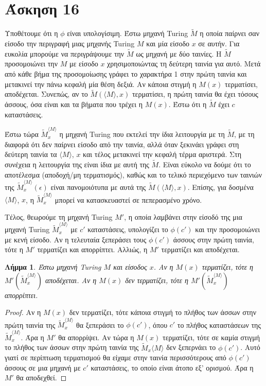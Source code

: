 \documentclass[a4paper, oneside, 11pt]{article}
\newtheorem{lm}[thm]{Λήμμα}
\theoremstyle{definition}
\begin{document}
\section*{Άσκηση 16}

Υποθέτουμε ότι η $\phi$ είναι υπολογίσιμη.
Έστω μηχανή Turing $\widetilde{M}$ η οποία παίρνει σαν είσοδο την περιγραφή μιας μηχανής Turing $M$ και μία
είσοδο $x$ σε αυτήν. 
Για ευκολία μπορούμε να περιγράψουμε την $\widetilde{M}$ ως μηχανή με δύο ταινίες. 
Η $\widetilde{M}$ προσομοιώνει την $M$ με είσοδο $x$ χρησιμοποιώντας τη δεύτερη ταινία για αυτό. 
Μετά από κάθε βήμα της προσομοίωσης γράφει το χαρακτήρα 1 στην πρώτη ταινία και μετακινεί την πάνω κεφαλή 
μία θέση δεξιά. Αν κάποια στιγμή η $M(x)$ τερματίσει, αποδέχεται. Συνεπώς, αν το $\widetilde{M}(\langle M\rangle,x)$ 
τερματίσει, 
η πρώτη ταινία θα έχει τόσους άσσους, όσα είναι και τα βήματα που τρέχει η $M(x)$. Έστω ότι η $\widetilde{M}$
έχει $c$ καταστάσεις.

Έστω τώρα $\widetilde{M}_{x}^{\langle M\rangle}$ η μηχανή Turing που εκτελεί την ίδια λειτουργία
με τη $\widetilde{M}$, με τη διαφορά ότι δεν παίρνει είσοδο από την ταινία, αλλά όταν ξεκινάει γράφει στη δεύτερη
ταινία τα $\langle M\rangle$, $x$ και τέλος μετακινεί την κεφαλή τέρμα αριστερά. Στη συνέχεια
η λειτουργία της είναι ίδια με αυτή της $\widetilde{M}$.
Είναι εύκολο να δούμε ότι το αποτέλεσμα (αποδοχή/μη τερματισμός), καθώς και το τελικό 
περιεχόμενο των ταινιών της $\widetilde{M}_{x}^{\langle M\rangle}(\epsilon)$ είναι πανομοιότυπα με αυτά της 
$\widetilde{M}(\langle M\rangle, x)$. Επίσης, για δοσμένα $\langle M\rangle$, $x$, η
$\widetilde{M}_{x}^{\langle M\rangle}$
μπορεί να κατασκευαστεί σε πεπερασμένο χρόνο.

Τέλος, θεωρούμε τη μηχανή Turing $M'$, η οποία λαμβάνει στην είσοδό της μια μηχανή Turing 
$\widetilde{M}_x^{\langle M\rangle}$ με $c'$
καταστάσεις, υπολογίζει το $\phi(c')$ και την προσομοιώνει με κενή είσοδο. 
Αν η τελευταία ξεπεράσει τους
$\phi(c')$ άσσους στην πρώτη ταινία, τότε η $M'$ τερματίζει και απορρίπτει.
Αλλιώς, η $M'$ τερματίζει και αποδέχεται.

\begin{lm}
Έστω μηχανή Turing $M$ και είσοδος $x$. Αν η $M(x)$ τερματίζει, τότε η $M'(\widetilde{M}_x^{\langle M\rangle})$
αποδέχεται. Αν η $M(x)$ δεν τερματίζει, τότε η $M'(\widetilde{M}_x^{\langle M\rangle})$ απορρίπτει.
\end{lm}
\begin{proof}
Αν η $M(x)$ δεν τερματίζει, τότε κάποια στιγμή το πλήθος των άσσων στην πρώτη ταινία της 
$\widetilde{M}_x^{\langle M\rangle}$
θα ξεπεράσει το $\phi(c')$, όπου $c'$ το πλήθος καταστάσεων της $\widetilde{M}_x^{\langle M\rangle}$. 
Άρα η $M'$ θα απορρίψει.
Αν τώρα η $M(x)$ τερματίζει, τότε σε καμία στιγμή το πλήθος των άσσων στην πρώτη ταινία της 
$\widetilde{M}_x{\langle M\rangle}$
δεν ξεπερνάει το $\phi(c')$. Αυτό γιατί σε περίπτωση τερματισμού θα είχαμε στην ταινία περισσότερους από $\phi(c')$
άσσους σε μια μηχανή με $c'$ καταστάσεις, το οποίο είναι άτοπο εξ' ορισμού. Άρα η $M'$ θα αποδεχθεί.
\end{proof}
\end{document}

